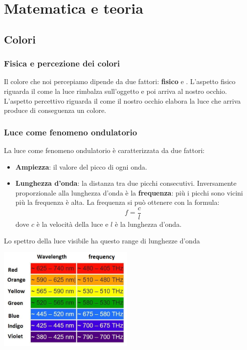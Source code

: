 \part{Matematica e teoria}
\chapter{Colori}

\section{Fisica e percezione dei colori}
Il colore che noi percepiamo dipende da due fattori: \textbf{fisico} e \textbf{}.
L'aspetto fisico riguarda il come la luce rimbalza sull'oggetto e poi arriva al
nostro occhio. L'aspetto percettivo riguarda il come il nostro occhio elabora la
luce che arriva produce di conseguenza un colore.

\section{Luce come fenomeno ondulatorio}
La luce come fenomeno ondulatorio \`e caratterizzata da due fattori:
\begin{itemize}
	\item \textbf{Ampiezza}: il valore del picco di ogni onda.
	\item \textbf{Lunghezza d'onda}: la distanza tra due picchi consecutivi. Inversamente
	      proporzionale alla lunghezza d'onda \`e la \textbf{frequenza}: pi\`u i picchi sono
	      vicini pi\`u la frequenza \`e alta. La frequenza si pu\`o ottenere con la formula:
	      \[ f = \frac{c}{l} \]
	      dove $c$ \`e la velocit\`a della luce e $l$ \`e la lunghezza d'onda.
\end{itemize}
Lo spettro della luce visibile ha questo range di lunghezze d'onda

\begin{center}
	\includegraphics[width=0.5\textwidth]{immagini/spettro_visibile}
\end{center}

